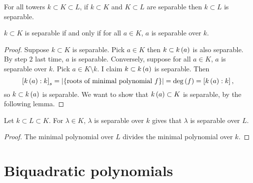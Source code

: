 \begin{corollary}
For all towers $ k \subset K \subset L $, if $ k \subset K $ and $ K \subset L $ are separable then $ k \subset L $ is separable.
\end{corollary}

\begin{corollary}
$ k \subset K $ is separable if and only if for all $ a \in K $, $ a $ is separable over $ k $.
\end{corollary}

\begin{proof}
Suppose $ k \subset K $ is separable. Pick $ a \in K $ then $ k \subset k\left( a \right) $ is also separable. By step $ 2 $ last time, $ a $ is separable. Conversely, suppose for all $ a \in K $, $ a $ is separable over $ k $. Pick $ a \in K \setminus k $. I claim $ k \subset k\left( a \right) $ is separable. Then
$$ \left[ k\left( a \right) : k \right]_s = \left\lvert \left\{ \text{roots of minimal polynomial} \ f \right\} \right\rvert = \deg\left( f \right) = \left[ k\left( a \right) : k \right], $$
so $ k \subset k\left( a \right) $ is separable. We want to show that $ k\left( a \right) \subset K $ is separable, by the following lemma.
\end{proof}

\begin{lemma}
Let $ k \subset L \subset K $. For $ \lambda \in K $, $ \lambda $ is separable over $ k $ gives that $ \lambda $ is separable over $ L $.
\end{lemma}

\begin{proof}
The minimal polynomial over $ L $ divides the minimal polynomial over $ k $.
\end{proof}

\pagebreak

\section{Biquadratic polynomials}

